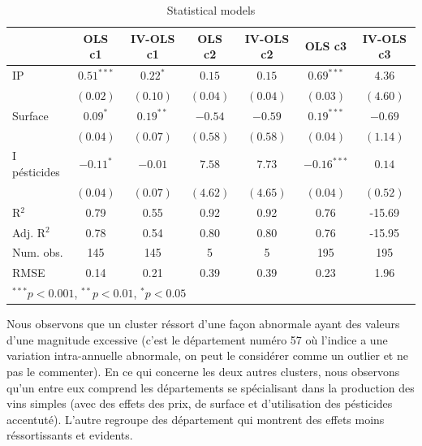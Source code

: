 \documentclass[11pt,]{article}
\begin{document}
\FloatBarrier

\begin{table}[!htbp]
\begin{center}
\begin{tabular}{l c c c c c c }
\hline
 & OLS c1 & IV-OLS c1 & OLS c2 & IV-OLS c2 & OLS c3 & IV-OLS c3 \\
\hline
IP           & $0.51^{***}$ & $0.22^{*}$  & $0.15$   & $0.15$   & $0.69^{***}$  & $4.36$   \\
             & $(0.02)$     & $(0.10)$    & $(0.04)$ & $(0.04)$ & $(0.03)$      & $(4.60)$ \\
Surface      & $0.09^{*}$   & $0.19^{**}$ & $-0.54$  & $-0.59$  & $0.19^{***}$  & $-0.69$  \\
             & $(0.04)$     & $(0.07)$    & $(0.58)$ & $(0.58)$ & $(0.04)$      & $(1.14)$ \\
I pésticides & $-0.11^{*}$  & $-0.01$     & $7.58$   & $7.73$   & $-0.16^{***}$ & $0.14$   \\
             & $(0.04)$     & $(0.07)$    & $(4.62)$ & $(4.65)$ & $(0.04)$      & $(0.52)$ \\
\hline
R$^2$        & 0.79         & 0.55        & 0.92     & 0.92     & 0.76          & -15.69   \\
Adj. R$^2$   & 0.78         & 0.54        & 0.80     & 0.80     & 0.76          & -15.95   \\
Num. obs.    & 145          & 145         & 5        & 5        & 195           & 195      \\
RMSE         & 0.14         & 0.21        & 0.39     & 0.39     & 0.23          & 1.96     \\
\hline
\multicolumn{7}{l}{\scriptsize{$^{***}p<0.001$, $^{**}p<0.01$, $^*p<0.05$}}
\end{tabular}
\caption{Statistical models}
\label{table : ols et ivols clusters}
\end{center}
\end{table}

\FloatBarrier

Nous observons que un cluster réssort d'une façon abnormale ayant des
valeurs d'une magnitude excessive (c'est le département numéro 57 où
l'indice a une variation intra-annuelle abnormale, on peut le considérer
comme un outlier et ne pas le commenter). En ce qui concerne les deux
autres clusters, nous observons qu'un entre eux comprend les
départements se spécialisant dans la production des vins simples (avec
des effets des prix, de surface et d'utilisation des pésticides
accentuté). L'autre regroupe des département qui montrent des effets
moins réssortissants et evidents.
\end{document}
